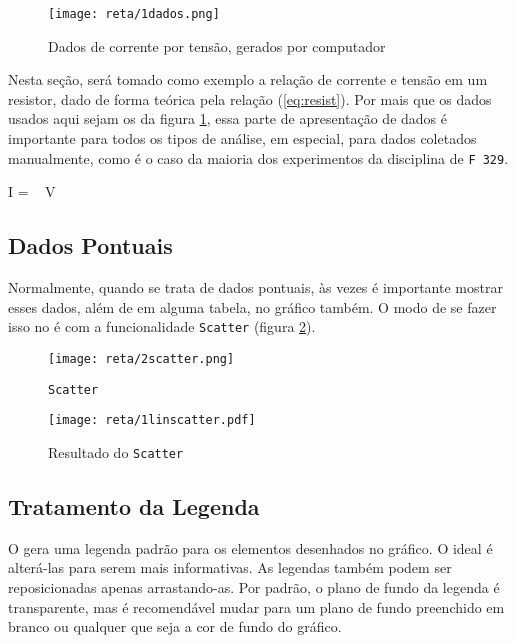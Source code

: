 \begin{figure}[htbp]
    \centering
    \texttt{[image: reta/1dados.png]}

    \caption{Dados de corrente por tensão, gerados por computador}
    \label{fig:reta:dados}
\end{figure}

Nesta seção, será tomado como exemplo a relação de corrente e tensão em um resistor, dado de forma teórica pela relação (\ref{eq:resist}). Por mais que os dados usados aqui sejam os da figura \ref{fig:reta:dados}, essa parte de apresentação de dados é importante para todos os tipos de análise, em especial, para dados coletados manualmente, como é o caso da maioria dos experimentos da disciplina de \texttt{F 329}.

\begin{equacao} \label{eq:resist}
    I =  ~ V
\end{equacao}


\subsection{Dados Pontuais}

    Normalmente, quando se trata de dados pontuais, às vezes é importante mostrar esses dados, além de em alguma tabela, no gráfico também. O modo de se fazer isso no \software é com a funcionalidade \texttt{Scatter} (figura \ref{fig:reta:scatter}).

    \begin{figure}[htbp]
        \centering
        \texttt{[image: reta/2scatter.png]}

        \caption{\texttt{Scatter}}
        \label{fig:reta:scatter}
    \end{figure}

    \begin{figure}[htbp]
        \centering
        \texttt{[image: reta/1linscatter.pdf]}

        \caption{Resultado do \texttt{Scatter}}
        \label{fig:reta:linscatter}
    \end{figure}


\subsection{Tratamento da Legenda}

    O \software gera uma legenda padrão para os elementos desenhados no gráfico. O ideal é alterá-las para serem mais informativas. As legendas também podem ser reposicionadas apenas arrastando-as. Por padrão, o plano de fundo da legenda é transparente, mas é recomendável mudar para um plano de fundo preenchido em branco ou qualquer que seja a cor de fundo do gráfico.

